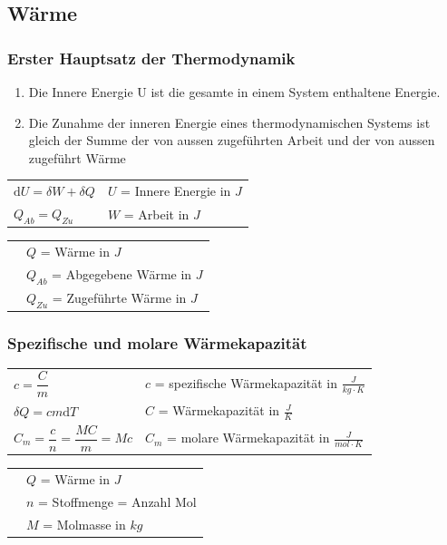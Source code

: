 	\subsection{Wärme}
		\begin{minipage}[t]{18cm}
			\subsubsection{Erster Hauptsatz der Thermodynamik}
				\begin{enumerate}
					\item  Die Innere Energie U ist die gesamte in einem System enthaltene Energie.
					\item Die Zunahme der inneren Energie eines thermodynamischen Systems ist gleich der Summe der von aussen zugeführten Arbeit und der von aussen zugeführt Wärme
				\end{enumerate}
				\renewcommand{\arraystretch}{2.5}
				\begin{tabular}{ p{4cm} | p{7cm}}
					$\mathrm{d} U = \delta W + \delta Q$	&	$U$ = Innere Energie in $J$\\
					$Q_{Ab} = Q_{Zu}$	& $W$ = Arbeit in $J$\\
				\end{tabular}
				\renewcommand{\arraystretch}{1.5}
				\newline
				\begin{tabular}{ p{4cm} | p{7cm} }
					& $Q$ = Wärme in $J$\\
					& $Q_{Ab}$ = Abgegebene Wärme in $J$\\
					& $Q_{Zu}$ = Zugeführte Wärme in $J$\\
				\end{tabular} 
				\renewcommand{\arraystretch}{1}
		\end{minipage}
		\newline
		\newline
		\newline
		\begin{minipage}[t]{18cm}
			\subsubsection{Spezifische und molare Wärmekapazität}
				\renewcommand{\arraystretch}{2.5}
				\begin{tabular}{ p{4cm} | p{7cm}}
					$c = \dfrac{C}{m}$	&	$c$ = spezifische Wärmekapazität in $\frac{J}{kg \cdot K}$\\
					$\delta Q = cm \mathrm{d} T$	&	$C$ = Wärmekapazität in $\frac{J}{K}$\\
					$C_m = \dfrac{c}{n} = \dfrac{MC}{m} = Mc$ & $C_m$ = molare Wärmekapazität in $\frac{J}{mol \cdot K}$
				\end{tabular}
				\renewcommand{\arraystretch}{1.5}
				\newline
				\begin{tabular}{ p{4cm} | p{7cm} }
					& $Q$ = Wärme in $J$\\
					& $n$ = Stoffmenge = Anzahl Mol\\
					& $M$ = Molmasse in $kg$\\
				\end{tabular} 
				\renewcommand{\arraystretch}{1}
		\end{minipage}
